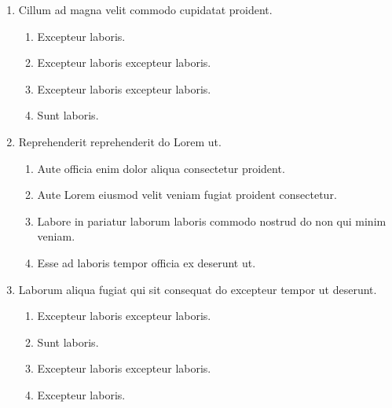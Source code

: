\documentclass[a4paper,12pt]{article}
\begin{document}
\begin{enumerate}[label=\textbf{\arabic*.}]
\begin{multicols}{2}
\begin{enumerate}
	\end{enumerate}

\end{multicols}
\item Cillum ad magna velit commodo cupidatat proident.
\begin{multicols}{2}
	\begin{enumerate}
		\item  Excepteur laboris.
    
		\item  Excepteur laboris excepteur laboris.
    
		\item  Excepteur laboris excepteur laboris.
  
		\item  Sunt laboris.
    
	\end{enumerate}

\end{multicols}
\item Reprehenderit reprehenderit do Lorem ut.
\begin{multicols}{2}
	\begin{enumerate}
		\item  Aute officia enim dolor aliqua consectetur proident.
    
		\item  Aute Lorem eiusmod velit veniam fugiat proident consectetur.
  
		\item  Labore in pariatur laborum laboris commodo nostrud do non qui minim veniam.
    
		\item  Esse ad laboris tempor officia ex deserunt ut.
    
	\end{enumerate}

\end{multicols}
\item Laborum aliqua fugiat qui sit consequat do excepteur tempor ut deserunt.
\begin{multicols}{2}
	\begin{enumerate}
		\item  Excepteur laboris excepteur laboris.
  
		\item  Sunt laboris.
    
		\item  Excepteur laboris excepteur laboris.
    
		\item  Excepteur laboris.
    

\end{enumerate}
\end{multicols}
\end{enumerate}
\end{document}
